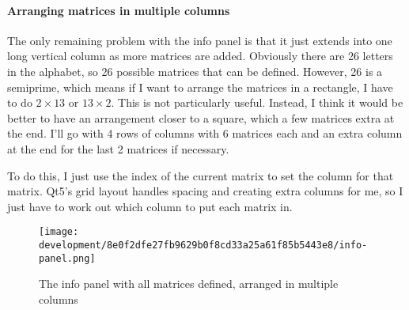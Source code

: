 \documentclass[../development.tex]{subfiles}
\begin{document}
\paragraph{Arranging matrices in multiple columns\label{development:teacher-suggestions:adding-the-info-panel:arranging-matrices-in-multiple-columns}}

The only remaining problem with the info panel is that it just extends into one long vertical column as more matrices are added. Obviously there are 26 letters in the alphabet, so 26 possible matrices that can be defined. However, 26 is a semiprime, which means if I want to arrange the matrices in a rectangle, I have to do $2 \times 13$ or $13 \times 2$. This is not particularly useful. Instead, I think it would be better to have an arrangement closer to a square, which a few matrices extra at the end. I'll go with 4 rows of columns with 6 matrices each and an extra column at the end for the last 2 matrices if necessary.

To do this, I just use the index of the current matrix to set the column for that matrix. Qt5's grid layout handles spacing and creating extra columns for me, so I just have to work out which column to put each matrix in.


\begin{figure}[H]
	\centering
	\texttt{[image: development/8e0f2dfe27fb9629b0f8cd33a25a61f85b5443e8/info-panel.png]}
	\caption{The info panel with all matrices defined, arranged in multiple columns}
	\label{fig:development:8e0f2dfe27fb9629b0f8cd33a25a61f85b5443e8:info-panel.png}
\end{figure}
\end{document}
